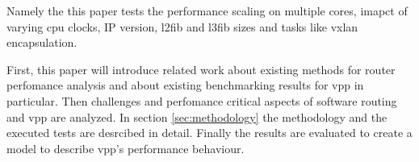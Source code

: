 
Namely the this paper tests the performance scaling on multiple cores,
imapct of varying cpu clocks, IP version, l2fib and l3fib sizes and
tasks like vxlan encapsulation.


First, this paper will introduce related work about existing methods
for router perfomance analysis and about existing benchmarking results
for \Ac{vpp} in particular. Then challenges and perfomance critical
aspects of software routing and \Ac{vpp} are analyzed. In section
\ref{sec:methodology} the methodology and the executed tests are
desrcibed in detail. Finally the results are evaluated to create a
model to describe \Ac{vpp}'s performance behaviour.
